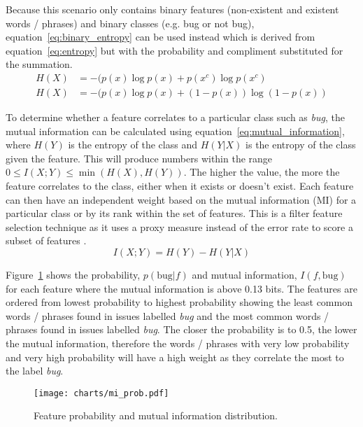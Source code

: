 Because this scenario only contains binary features (non-existent and existent words / phrases) and binary classes
(e.g. bug or not bug), equation~\ref{eq:binary_entropy} can be used instead which is derived from equation~\ref{eq:entropy} but
with the probability and compliment substituted for the summation.
\begin{equation}
    \label{eq:binary_entropy}
    \begin{split}
        H(X) &= -(p(x) \log p(x) + p(x^c)     \log p(x^c)    \\
        H(X) &= -(p(x) \log p(x) + (1 - p(x)) \log(1 - p(x))
    \end{split}
\end{equation}

To determine whether a feature correlates to a particular class such as \textit{bug}, the mutual information can be calculated
using equation~\ref{eq:mutual_information}, where $H(Y)$ is the entropy of the class and $H(Y|X)$ is the entropy of the class
given the feature. This will produce numbers within the range $0 \leq I(X;Y) \leq \min(H(X), H(Y))$. The higher the value, the
more the feature correlates to the class, either when it exists or doesn't exist. Each feature can then have an independent
weight based on the mutual information (MI) for a particular class or by its rank within the set of features. This is a filter
feature selection technique as it uses a proxy measure instead of the error rate to score a subset of
features \cite{wikipedia:featureselection}.
\begin{equation}
    \label{eq:mutual_information}
    I(X;Y) = H(Y) - H(Y|X)
\end{equation}

Figure~\ref{fig:mi_prob} shows the probability, $p(\mathrm{bug}|f)$ and mutual information, $I(f,\mathrm{bug})$ for each feature
where the mutual information is above 0.13 bits. The features are ordered from lowest probability to highest probability showing
the least common words / phrases found in issues labelled \textit{bug} and the most common words / phrases found in issues
labelled \textit{bug}. The closer the probability is to 0.5, the lower the mutual information, therefore the words / phrases
with very low probability and very high probability will have a high weight as they correlate the most to the label
\textit{bug}.
\begin{figure}[h]
    \centering
    \texttt{[image: charts/mi\_prob.pdf]}
    \caption{Feature probability and mutual information distribution.}
    \label{fig:mi_prob}
\end{figure}

